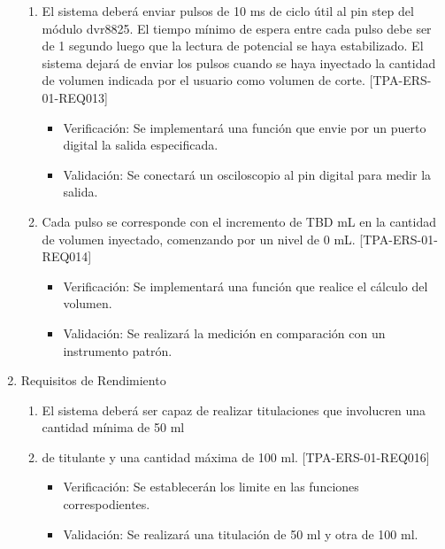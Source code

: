 \documentclass[11pt]{charter}
\begin{document}
\begin{enumerate}
\begin{enumerate}
	\item El sistema deberá enviar pulsos de 10 ms de ciclo útil al pin step del módulo dvr8825. El tiempo mínimo de espera entre cada pulso debe ser de 1 segundo luego que la lectura de potencial se haya estabilizado. El sistema dejará de enviar los pulsos cuando se haya inyectado la cantidad de volumen indicada por el usuario como volumen de corte. [TPA-ERS-01-REQ013]
	\begin{itemize}
\item Verificación: Se implementará una función que envie por un puerto digital la salida especificada.\\
\item Validación: Se conectará un osciloscopio al pin digital para medir la salida.\\
\end{itemize}

	\item Cada pulso se corresponde con el incremento de TBD mL en la cantidad de volumen inyectado, comenzando por un nivel de 0 mL. [TPA-ERS-01-REQ014]
		\begin{itemize}
\item Verificación: Se implementará una función que realice el cálculo del volumen.\\
\item Validación: Se realizará la medición en comparación con un instrumento patrón.\\
\end{itemize}


\end{enumerate}

\item Requisitos de Rendimiento
	\begin{enumerate}
	\item El sistema deberá ser capaz de realizar titulaciones que involucren una cantidad mínima de 50 ml 	\item de titulante y una cantidad máxima de 100 ml. [TPA-ERS-01-REQ016]
	\begin{itemize}
\item Verificación: Se establecerán los limite en las funciones correspodientes.\\
\item Validación: Se realizará una titulación de 50 ml y otra de 100 ml.\\
\end{itemize}
	\end{enumerate}
	

\end{enumerate}
\end{document}
